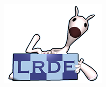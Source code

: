 \begin{titlepage}
\begin{minipage}{0.3\textwidth}
  \includegraphics[width=\linewidth]{./img/lrde.png}%
\end{minipage}%
%
\titlepagedecoration
%
\end{titlepage}